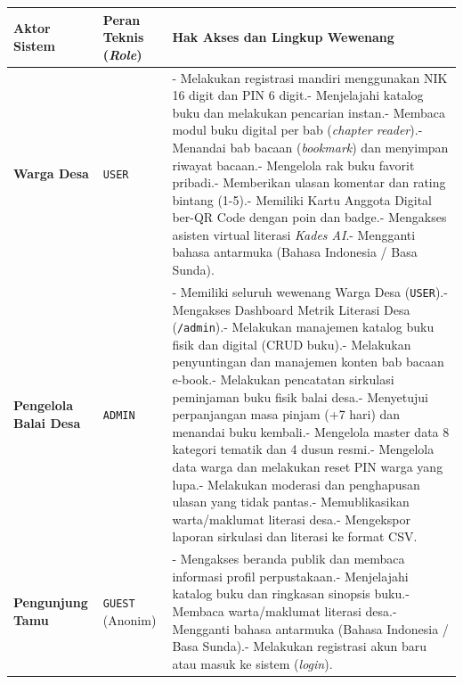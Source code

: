 \documentclass[
  indonesian,
  12pt,
]{report}
\newcounter{none} %
\begin{document}
{\def\LTcaptype{none} %
\begin{longtable}[]{@{}
  >{\raggedright\arraybackslash}p{}
  >{\raggedright\arraybackslash}p{}
  >{\raggedright\arraybackslash}p{}@{}}
\toprule\noalign{}
\begin{minipage}[b]{\linewidth}\raggedright
Aktor Sistem
\end{minipage} & \begin{minipage}[b]{\linewidth}\raggedright
Peran Teknis (\emph{Role})
\end{minipage} & \begin{minipage}[b]{\linewidth}\raggedright
Hak Akses dan Lingkup Wewenang
\end{minipage} \\
\midrule\noalign{}
\endhead
\bottomrule\noalign{}
\endlastfoot
\textbf{Warga Desa} & \texttt{USER} & - Melakukan registrasi mandiri
menggunakan NIK 16 digit dan PIN 6 digit.- Menjelajahi katalog buku dan
melakukan pencarian instan.- Membaca modul buku digital per bab
(\emph{chapter reader}).- Menandai bab bacaan (\emph{bookmark}) dan
menyimpan riwayat bacaan.- Mengelola rak buku favorit pribadi.-
Memberikan ulasan komentar dan rating bintang (1-5).- Memiliki Kartu
Anggota Digital ber-QR Code dengan poin dan badge.- Mengakses asisten
virtual literasi \emph{Kades AI}.- Mengganti bahasa antarmuka (Bahasa
Indonesia / Basa Sunda). \\
\textbf{Pengelola Balai Desa} & \texttt{ADMIN} & - Memiliki seluruh
wewenang Warga Desa (\texttt{USER}).- Mengakses Dashboard Metrik
Literasi Desa (\texttt{/admin}).- Melakukan manajemen katalog buku fisik
dan digital (CRUD buku).- Melakukan penyuntingan dan manajemen konten
bab bacaan e-book.- Melakukan pencatatan sirkulasi peminjaman buku fisik
balai desa.- Menyetujui perpanjangan masa pinjam (+7 hari) dan menandai
buku kembali.- Mengelola master data 8 kategori tematik dan 4 dusun
resmi.- Mengelola data warga dan melakukan reset PIN warga yang lupa.-
Melakukan moderasi dan penghapusan ulasan yang tidak pantas.-
Memublikasikan warta/maklumat literasi desa.- Mengekspor laporan
sirkulasi dan literasi ke format CSV. \\
\textbf{Pengunjung Tamu} & \texttt{GUEST} (Anonim) & - Mengakses beranda
publik dan membaca informasi profil perpustakaan.- Menjelajahi katalog
buku dan ringkasan sinopsis buku.- Membaca warta/maklumat literasi
desa.- Mengganti bahasa antarmuka (Bahasa Indonesia / Basa Sunda).-
Melakukan registrasi akun baru atau masuk ke sistem (\emph{login}). \\
\end{longtable}
}
\end{document}
